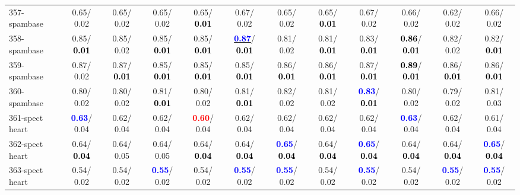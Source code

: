 \begin{table}[h]
\begin{center}
{\begin{tabular}{lc|c|c|c|c|c|c|c|c|c|c}
357-spambase &   0.65/  0.02 &   0.65/  0.02 &   0.65/  0.02 &   0.65/\textcolor{black}{\textbf{  0.01}} &   0.67/  0.02 &   0.65/  0.02 &   0.65/\textcolor{black}{\textbf{  0.01}} &   0.67/  0.02 &   0.66/  0.02 &   0.62/  0.02 &   0.66/  0.02 \\
358-spambase &   0.85/\textcolor{black}{\textbf{  0.01}} &   0.85/  0.02 &   0.85/\textcolor{black}{\textbf{  0.01}} &   0.85/\textcolor{black}{\textbf{  0.01}} & \underline{\textcolor{blue}{\textbf{  0.87}}}/\textcolor{black}{\textbf{  0.01}} &   0.81/  0.02 &   0.81/\textcolor{black}{\textbf{  0.01}} &   0.83/\textcolor{black}{\textbf{  0.01}} & \textcolor{black}{\textbf{  0.86}}/\textcolor{black}{\textbf{  0.01}} &   0.82/  0.02 &   0.82/\textcolor{black}{\textbf{  0.01}} \\
359-spambase &   0.87/  0.02 &   0.87/\textcolor{black}{\textbf{  0.01}} &   0.85/\textcolor{black}{\textbf{  0.01}} &   0.85/\textcolor{black}{\textbf{  0.01}} &   0.85/\textcolor{black}{\textbf{  0.01}} &   0.86/\textcolor{black}{\textbf{  0.01}} &   0.86/\textcolor{black}{\textbf{  0.01}} &   0.87/\textcolor{black}{\textbf{  0.01}} & \textcolor{black}{\textbf{  0.89}}/\textcolor{black}{\textbf{  0.01}} &   0.86/\textcolor{black}{\textbf{  0.01}} &   0.86/\textcolor{black}{\textbf{  0.01}} \\ \hline
360-spambase &   0.80/  0.02 &   0.80/  0.02 &   0.81/\textcolor{black}{\textbf{  0.01}} &   0.80/  0.02 &   0.81/\textcolor{black}{\textbf{  0.01}} &   0.82/  0.02 &   0.81/  0.02 & \textcolor{blue}{\textbf{  0.83}}/\textcolor{black}{\textbf{  0.01}} &   0.80/  0.02 &   0.79/  0.02 &   0.81/  0.03 \\
361-spect heart & \textcolor{blue}{\textbf{  0.63}}/  0.04 &   0.62/  0.04 &   0.62/  0.04 & \textcolor{red}{\textbf{  0.60}}/  0.04 &   0.62/  0.04 &   0.62/  0.04 &   0.62/  0.04 &   0.62/  0.04 & \textcolor{blue}{\textbf{  0.63}}/  0.04 &   0.62/  0.04 &   0.61/  0.04 \\
362-spect heart &   0.64/\textcolor{black}{\textbf{  0.04}} &   0.64/  0.05 &   0.64/  0.05 &   0.64/\textcolor{black}{\textbf{  0.04}} &   0.64/\textcolor{black}{\textbf{  0.04}} & \textcolor{blue}{\textbf{  0.65}}/\textcolor{black}{\textbf{  0.04}} &   0.64/\textcolor{black}{\textbf{  0.04}} & \textcolor{blue}{\textbf{  0.65}}/\textcolor{black}{\textbf{  0.04}} &   0.64/\textcolor{black}{\textbf{  0.04}} &   0.64/\textcolor{black}{\textbf{  0.04}} & \textcolor{blue}{\textbf{  0.65}}/\textcolor{black}{\textbf{  0.04}} \\
363-spect heart &   0.54/  0.02 &   0.54/  0.02 & \textcolor{blue}{\textbf{  0.55}}/  0.02 &   0.54/  0.02 & \textcolor{blue}{\textbf{  0.55}}/  0.02 & \textcolor{blue}{\textbf{  0.55}}/  0.02 &   0.54/  0.02 & \textcolor{blue}{\textbf{  0.55}}/  0.02 &   0.54/  0.02 & \textcolor{blue}{\textbf{  0.55}}/  0.02 & \textcolor{blue}{\textbf{  0.55}}/  0.02 \\

\end{tabular}}
\end{center}
\end{table}
